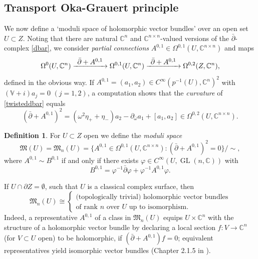 \documentclass[JEP,XML,SOM,Unicode,published]{cedram}
\newcommand\To[1]{\mathchoice{\xrightarrow{\textstyle\kern4pt#1\kern3pt}}{\stackrel{#1}{\longrightarrow}}{}{}}
\DeclareMathOperator{\GL}{GL}
\theoremstyle{plain}
\theoremstyle{definition}
\newtheorem{definition}[theorem]{Definition}
\newcommand{\C}{\mathbb{C}}
\newcommand{\V}{\mathbb{V}}
\newcommand{\M}{\mathfrak{M}}
\newcommand{\1}{{\bf 1}}
\begin{document}
\subsection{Transport Oka-Grauert principle} We now define a `moduli space of holomorphic vector bundles' over an open set $U\subset Z$. Noting that there are natural $\C^n$ and $\C^{n\times n}$-valued versions of the $\bar \partial$-complex \eqref{dbar}, we consider \emph{partial connections} $A^{0,1}\in \Omega^{0,1}(U,\C^{n\times n})$ and maps
\begin{equation}\label{twisteddbar}
\Omega^0(U,\C^n) \To{\bar \partial + A^{0,1}} \Omega^{0,1}(U,\C^n) \To{\bar \partial + A^{0,1}} \Omega^{0,2}(Z,\C^n),
\end{equation}
defined in the obvious way. If $A^{0,1}=(a_1,a_2)\in C^\infty(p^{-1}(U),\C^n)^2$ with $(\V + i)a_j=0$ $(j=1,2)$, a computation shows that the \emph{curvature} of \eqref{twisteddbar} equals
\begin{equation}\label{curvature}
(\bar \partial + A^{0,1})^2 = (\omega^2 \eta_++\eta_-) a_2 - \partial_{\bar \omega} a_1 + [a_1,a_2] \in \Omega^{0,2}(U,\C^{n\times n}).
\end{equation}

\begin{definition} \label{modulispace} For $U\subset Z$ open we define the \emph{moduli space}
\begin{equation*}
\M(U)=\M_n(U)= \{A^{0,1}\in \Omega^{0,1}(U,\C^{n\times n}): (\bar\partial+A^{0,1})^2=0 \}/\sim,
\end{equation*}
where $A^{0,1}\sim B^{0,1}$ if and only if there exists $\varphi\in C^\infty(U,\GL(n,\C))$ with
\begin{equation*}
B^{0,1}=\varphi^{-1} \bar \partial \varphi + \varphi^{-1} A^{0,1} \varphi.
\end{equation*}
\end{definition}

If $U\cap \partial Z=\emptyset$, such that $U$ is a classical complex surface, then
\begin{equation}\label{dokro}
\M_n(U) \cong\begin{cases}
\text{(topologically trivial) holomorphic vector bundles}\\
\text{of rank $n$ over $U$ up to isomorphism.}
\end{cases}
\end{equation}
Indeed, a representative $A^{0,1}$ of a class in $\M_n(U)$ equips $U\times \C^n$ with the structure of a holomorphic vector bundle by declaring a local section $f:V\to \C^n$ (for $V\subset U$ open) to be holomorphic, if $(\bar \partial + A^{0,1})f=0$; equivalent representatives yield isomorphic vector bundles (\cf Chapter 2.1.5 in \cite{DoKr90}).
\end{document}

